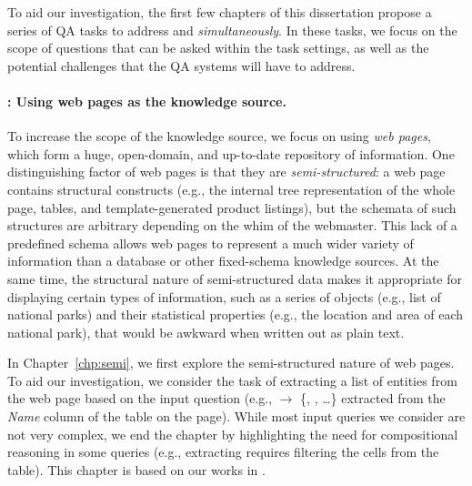 To aid our investigation,
the first few chapters of this dissertation
propose a series of 
QA tasks
to address \Breadth and \Depth \emph{simultaneously}.
In these tasks,
we focus on the scope of questions that can be asked
within the task settings,
as well as the potential challenges that the QA systems
will have to address.

\paragraph{\Breadth: Using web pages as the knowledge source.}
To increase the scope of the knowledge source,
we focus on using \emph{web pages},
which form a huge, open-domain, and up-to-date
repository of information.
One distinguishing factor of web pages
is that they are \emph{semi-structured}:
a web page contains structural constructs
(e.g., the internal tree representation of the whole page,
tables, and template-generated product listings),
but the schemata of such structures are arbitrary
depending on the whim of the webmaster.
This lack of a predefined schema
allows web pages to represent a much 
wider variety of information
than a database or
other fixed-schema knowledge sources.
At the same time,
the structural nature of semi-structured data
makes it appropriate for displaying certain types of information,
such as a series of objects (e.g., list of national parks)
and their statistical properties
(e.g., the location and area of each national park),
that would be awkward when written out as plain text.

In Chapter~\ref{chp:semi},
we first explore the semi-structured nature of web pages.
To aid our investigation, we consider the task of 
extracting a list of entities from the web page
based on the input question
(e.g., 
$\to$ \{, , \dots\}
extracted from the \emph{Name} column of the table on the page).
While most input queries we consider are not very complex,
we end the chapter by highlighting the need
for compositional reasoning
in some queries
(e.g., extracting 
requires filtering the cells from the table).
This chapter is based on our works in
\citet{pasupat2014extraction}.

